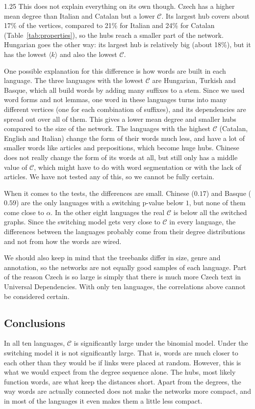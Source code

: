 \documentclass[12pt]{article}
\newcommand{\metric}{\mathcal{C}}
\begin{document}
\begin{spacing}{1.25}
This does not explain everything on its own though. Czech has a higher mean degree than Italian and Catalan but a lower $\metric$. Its largest hub covers about 17\% of the vertices, compared to 21\% for Italian and 24\% for Catalan (Table~\ref{tab:properties}), so the hubs reach a smaller part of the network. Hungarian goes the other way: its largest hub is relatively big (about 18\%), but it has the lowest $\langle k\rangle$ and also the lowest $\metric$.

One possible explanation for this difference is how words are built in each language. The three languages with the lowest $\metric$ are Hungarian, Turkish and Basque, which all build words by adding many suffixes to a stem. Since we used word forms and not lemmas, one word in these languages turns into many different vertices (one for each combination of suffixes), and its dependencies are spread out over all of them. This gives a lower mean degree and smaller hubs compared to the size of the network. The languages with the highest $\metric$ (Catalan, English and Italian) change the form of their words much less, and have a lot of smaller words like articles and prepositions, which become huge hubs. Chinese does not really change the form of its words at all, but still only has a middle value of $\metric$, which might have to do with word segmentation or with the lack of articles. We have not tested any of this, so we cannot be fully certain.

When it comes to the tests, the differences are small. Chinese ($0.17$) and Basque ($0.59$) are the only languages with a switching p-value below $1$, but none of them come close to $\alpha$. In the other eight languages the real $\metric$ is below all the switched graphs. Since the switching model gets very close to $\metric$ in every language, the differences between the languages probably come from their degree distributions and not from how the words are wired.

We should also keep in mind that the treebanks differ in size, genre and annotation, so the networks are not equally good samples of each language. Part of the reason Czech is so large is simply that there is much more Czech text in Universal Dependencies. With only ten languages, the correlations above cannot be considered certain.

\subsection{Conclusions}
In all ten languages, $\metric$ is significantly large under the binomial model. Under the switching model it is not significantly large. That is, words are much closer to each other than they would be if links were placed at random. However, this is what we would expect from the degree sequence alone. The hubs, most likely function words, are what keep the distances short. Apart from the degrees, the way words are actually connected does not make the networks more compact, and in most of the languages it even makes them a little less compact.


\end{spacing}
\end{document}
